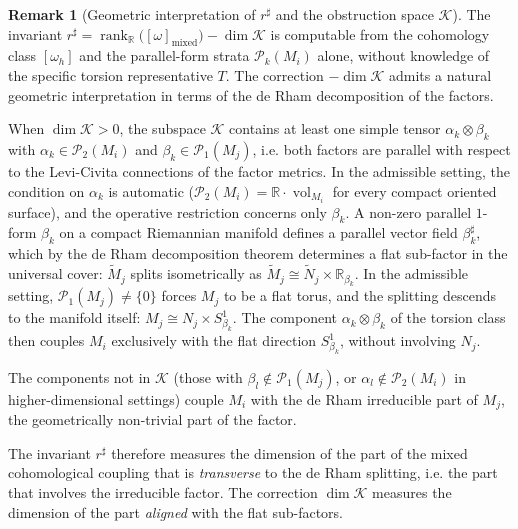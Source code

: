 \documentclass[11pt,reqno]{amsart}
\theoremstyle{plain}
\theoremstyle{definition}
\newtheorem{remark}[theorem]{Remark}
\numberwithin{equation}{section}
\begin{document}
\begin{remark}[Geometric interpretation of $r^\sharp$ and the obstruction space $\mathcal{K}$]
\label{rem:deRham}
The invariant $r^{\sharp} = \operatorname{rank}_{\mathbb{R}}\bigl([\omega]_{\mathrm{mixed}}\bigr) - \dim\mathcal{K}$ is computable from the cohomology class $[\omega_h]$ and the parallel-form strata $\mathcal{P}_k(M_i)$ alone, without knowledge of the specific torsion representative $T$.
The correction $-\dim\mathcal{K}$ admits a natural geometric
interpretation in terms of the de Rham decomposition of the factors.

When $\dim\mathcal{K}>0$, the subspace $\mathcal{K}$ contains at least one simple tensor $\alpha_k\otimes\beta_k$ with
$\alpha_k\in\mathcal{P}_2(M_i)$ and $\beta_k\in\mathcal{P}_1(M_j)$, i.e. both factors are parallel with respect to the Levi-Civita connections of the factor metrics.
In the admissible setting, the condition on $\alpha_k$ is automatic ($\mathcal{P}_2(M_i)=\mathbb{R}\cdot\operatorname{vol}_{M_i}$ for every compact oriented surface), and the operative restriction concerns only $\beta_k$.
A non-zero parallel $1$-form $\beta_k$ on a compact Riemannian
manifold defines a parallel vector field $\beta_k^{\sharp}$, which by the de Rham decomposition theorem determines a flat sub-factor in the universal cover: $\widetilde{M}_j$ splits isometrically as $\widetilde{M}_j\cong\widetilde{N}_j\times\mathbb{R}_{\beta_k}$.
In the admissible setting, $\mathcal{P}_1(M_j)\neq\{0\}$ forces
$M_j$ to be a flat torus, and the splitting descends to the
manifold itself: $M_j\cong N_j\times S^1_{\beta_k}$.
The component $\alpha_k\otimes\beta_k$ of the torsion class then couples $M_i$ exclusively with the flat direction $S^1_{\beta_k}$, without involving $N_j$.

The components not in $\mathcal{K}$ (those with
$\beta_l\notin\mathcal{P}_1(M_j)$, or
$\alpha_l\notin\mathcal{P}_2(M_i)$ in higher-dimensional settings) couple $M_i$ with the de Rham irreducible part of $M_j$, the geometrically non-trivial part of the factor.

The invariant $r^{\sharp}$ therefore measures the dimension of the part of the mixed cohomological coupling that is \emph{transverse} to the de Rham splitting, i.e. the part that involves the irreducible factor.
The correction $\dim\mathcal{K}$ measures the dimension of the part \emph{aligned} with the flat sub-factors.


\end{remark}
\end{document}
